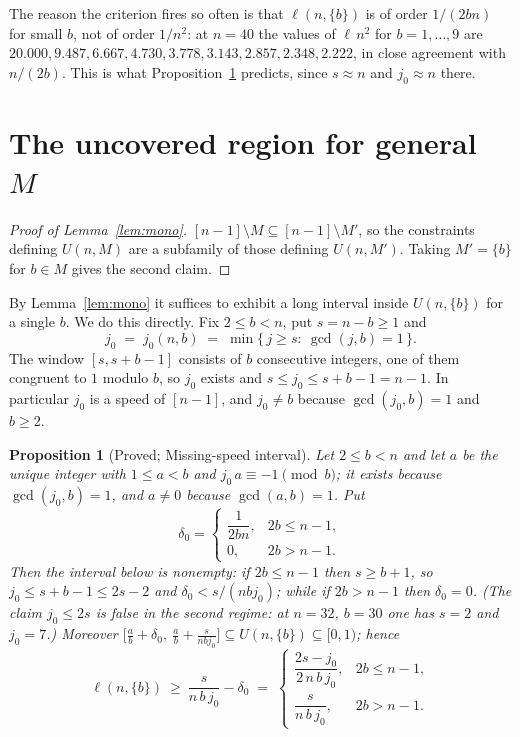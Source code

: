 \documentclass[11pt]{amsart}
\theoremstyle{plain}
\newtheorem{proposition}[theorem]{Proposition}
\theoremstyle{definition}
\begin{document}
The reason the criterion fires so often is that $\ell(n,\{b\})$ is of order $1/(2bn)$ for small $b$,
not of order $1/n^{2}$: at $n=40$ the values of $\ell\,n^{2}$ for $b=1,\dots,9$ are
$20.000,9.487,6.667,4.730,3.778,3.143,2.857,2.348,2.222$, in close agreement with $n/(2b)$. This is
what Proposition~\ref{prop:missing} predicts, since $s\approx n$ and $j_0\approx n$ there.

\section{The uncovered region for general \texorpdfstring{$M$}{M}}\label{sec:region}

\begin{proof}[Proof of Lemma~\ref{lem:mono}]
$[n-1]\setminus M\subseteq[n-1]\setminus M'$, so the constraints defining $U(n,M)$ are a subfamily of
those defining $U(n,M')$. Taking $M'=\{b\}$ for $b\in M$ gives the second claim.
\end{proof}

By Lemma~\ref{lem:mono} it suffices to exhibit a long interval inside $U(n,\{b\})$ for a single $b$.
We do this directly. Fix $2\le b<n$, put $s=n-b\ge1$ and
\[
  j_0\;=\;j_0(n,b)\;=\;\min\{\,j\ge s:\ \gcd(j,b)=1\,\}.
\]
The window $[s,s+b-1]$ consists of $b$ consecutive integers, one of them congruent to $1$ modulo $b$,
so $j_0$ exists and $s\le j_0\le s+b-1=n-1$. In particular $j_0$ is a speed of $[n-1]$, and
$j_0\ne b$ because $\gcd(j_0,b)=1$ and $b\ge2$.

\begin{proposition}[Proved; Missing-speed interval]\label{prop:missing}
Let $2\le b<n$ and let $a$ be the unique integer with $1\le a<b$ and $j_0\,a\equiv-1\pmod b$; it
exists because $\gcd(j_0,b)=1$, and $a\ne0$ because $\gcd(a,b)=1$. Put
\[
  \delta_0=\begin{cases}\dfrac{1}{2bn}, & 2b\le n-1,\\[2mm] 0, & 2b>n-1.\end{cases}
\]
Then the interval below is nonempty: if $2b\le n-1$ then $s\ge b+1$, so $j_0\le s+b-1\le 2s-2$ and
$\delta_0<s/(nbj_0)$; while if $2b>n-1$ then $\delta_0=0$. (The claim $j_0\le 2s$ is false in the
second regime: at $n=32$, $b=30$ one has $s=2$ and $j_0=7$.) Moreover
$\bigl[\tfrac ab+\delta_0,\ \tfrac ab+\tfrac{s}{nbj_0}\bigr]\subseteq U(n,\{b\})\subseteq[0,1)$; hence
\[
  \ell(n,\{b\})\ \ge\ \frac{s}{n\,b\,j_0}-\delta_0
  \;=\;\begin{cases}\dfrac{2s-j_0}{2\,n\,b\,j_0}, & 2b\le n-1,\\[2mm]
                    \dfrac{s}{n\,b\,j_0}, & 2b>n-1.\end{cases}
\]
\end{proposition}
\end{document}
